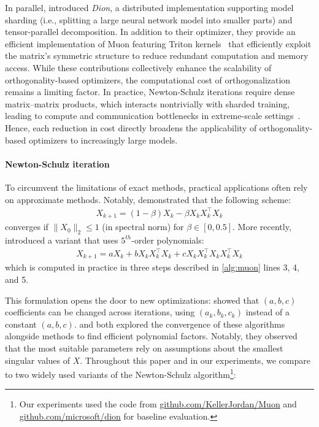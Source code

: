 In parallel, \cite{ahn_dion_2025} introduced \textit{Dion}, a distributed implementation supporting model sharding (i.e., splitting a large neural network model into smaller parts) and tensor-parallel decomposition. In addition to their optimizer, they provide an efficient implementation of Muon featuring Triton kernels~\cite{tillet2019triton} that efficiently exploit the matrix’s symmetric structure to reduce redundant computation and memory access. While these contributions collectively enhance the scalability of orthogonality-based optimizers, the computational cost of orthogonalization remains a limiting factor. 
In practice, Newton-Schulz iterations require dense matrix–matrix products, which interacts nontrivially with sharded training, leading to compute and communication bottlenecks in extreme-scale settings~\cite{essential2025muon}. Hence, each reduction in cost directly broadens the applicability of orthogonality-based optimizers to increasingly large models.

\paragraph{Newton-Schulz iteration}

To circumvent the limitations of exact methods, practical applications often rely on approximate methods. Notably, \cite{bjorck1971iterative} demonstrated that the following scheme:
\begin{align}
\label{eq:bjork}
    X_{k+1} = (1- \beta) X_k -  \beta X_k X_k^\top X_k
\end{align}
converges if $\|X_0\|_2\leq 1$ (in spectral norm) for $\beta \in \left[0, 0.5\right]$. More recently, \cite{jordan2024muon} introduced a variant that uses $5^{th}$-order polynomials:
\begin{align}
\label{eq:ns_quintic}
    X_{k+1} = a X_k + b X_k X_k^\top X_k + c X_k X_k^\top X_k X_k^\top X_k
\end{align}
which is computed in practice in three steps described in \cref{alg:muon} lines 3, 4, and 5.

This formulation opens the door to new optimizations: \cite{cesista2025muonoptcoeffs} showed that $(a,b,c)$ coefficients can be changed across iterations, using $(a_k, b_k, c_k)$ instead of a constant $(a,b,c)$. \cite{amsel2025polar} and \cite{grishina_accelerating_2025} both explored the convergence of these algorithms alongside methods to find efficient polynomial factors. Notably, they observed that the most suitable parameters rely on assumptions about the smallest singular values of $X$.
Throughout this paper and in our experiments, we compare to two widely used variants of the Newton-Schulz algorithm\footnote{Our experiments used the code from \href{https://github.com/KellerJordan/Muon}{github.com/KellerJordan/Muon} and \href{https://github.com/microsoft/dion}{github.com/microsoft/dion} for baseline evaluation.}:


